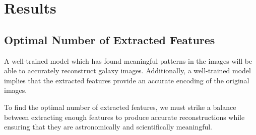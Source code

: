 \documentclass[12pt, onecolumn]{article}
\begin{document}
    

\newpage

\section{Results} 
\label{Results}

    \subsection{Optimal Number of Extracted Features}
    \label{no_extracted_features}

    A well-trained model which has found meaningful patterns in the images will be able to accurately reconstruct galaxy images. Additionally, a well-trained model implies that the extracted features provide an accurate encoding of the original images. 
    
    To find the optimal number of extracted features, we must strike a balance between extracting enough features to produce accurate reconstructions while ensuring that they are astronomically and scientifically meaningful.
\end{document}
